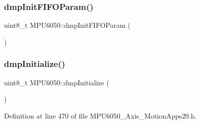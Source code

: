 \subsubsection{\texorpdfstring{dmpInitFIFOParam()}{dmpInitFIFOParam()}}
{\footnotesize\ttfamily uint8\+\_\+t M\+P\+U6050\+::dmp\+Init\+F\+I\+F\+O\+Param (\begin{DoxyParamCaption}{ }\end{DoxyParamCaption})}

\mbox{\label{classMPU6050_a8b97688e8dd18be09865c2a31c4f3fe9}} 
\subsubsection{\texorpdfstring{dmpInitialize()}{dmpInitialize()}}
{\footnotesize\ttfamily uint8\+\_\+t M\+P\+U6050\+::dmp\+Initialize (\begin{DoxyParamCaption}{ }\end{DoxyParamCaption})}



Definition at line 470 of file M\+P\+U6050\+\_\+Axis\+\_\+\+Motion\+Apps20.\+h.


